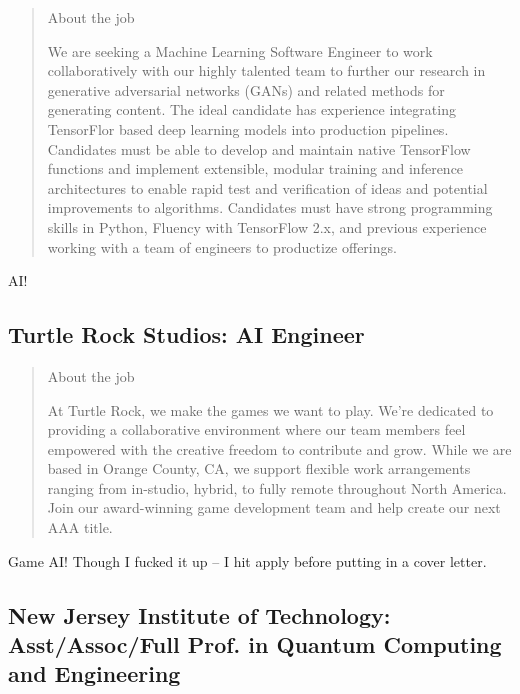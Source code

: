\documentclass[
	letterpaper, %
	12pt, %
]{CSSullivanBusinessReport}
\begin{document}
\begin{quote}
	About the job
	
	We are seeking a Machine Learning Software Engineer to work collaboratively with our highly talented team to further our research in generative adversarial networks (GANs) and related methods for generating content. The ideal candidate has experience integrating TensorFlor based deep learning models into production pipelines. Candidates must be able to develop and maintain native TensorFlow functions and implement extensible, modular training and inference architectures to enable rapid test and verification of ideas and potential improvements to algorithms. Candidates must have strong programming skills in Python, Fluency with TensorFlow 2.x, and previous experience working with a team of engineers to productize offerings.

\end{quote}

AI!


\subsection[Turtle Rock Studios]{Turtle Rock Studios: AI Engineer}

\begin{quote}
	About the job
	
	At Turtle Rock, we make the games we want to play. We're dedicated to providing a collaborative environment where our team members feel empowered with the creative freedom to contribute and grow. While we are based in Orange County, CA, we support flexible work arrangements ranging from in-studio, hybrid, to fully remote throughout North America. Join our award-winning game development team and help create our next AAA title.

\end{quote}

Game AI! Though I fucked it up -- I hit apply before putting in a cover letter. 



\subsection[New Jersey Institute of Technology]{New Jersey Institute of Technology: Asst/Assoc/Full Prof. in Quantum Computing and Engineering}
\end{document}
